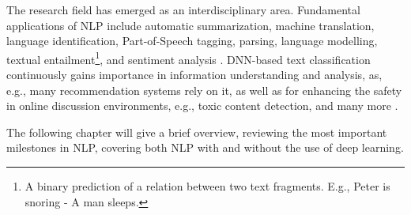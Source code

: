 The research field has emerged as an interdisciplinary area. Fundamental applications of NLP include automatic summarization, machine translation, language identification, Part-of-Speech tagging, parsing, language modelling, textual entailment\footnote{A binary prediction of a relation between two text fragments. E.g., Peter is snoring - A man sleeps.}, and sentiment analysis \cite{mani2001automatic, dostert1955georgetown, tang2017phonetic, schmid1994part, bengio2003neural, socher2013recursive,dagan2005pascal, prabowo2009sentiment}. DNN-based text classification continuously gains importance in information understanding and analysis, as, e.g., many recommendation systems rely on it, as well as for enhancing the safety in online discussion environments, e.g., toxic content detection, and many more \cite{kumar2011natural}. 



The following chapter will give a brief overview, reviewing the most important milestones in NLP, covering both NLP with and without the use of deep learning.


